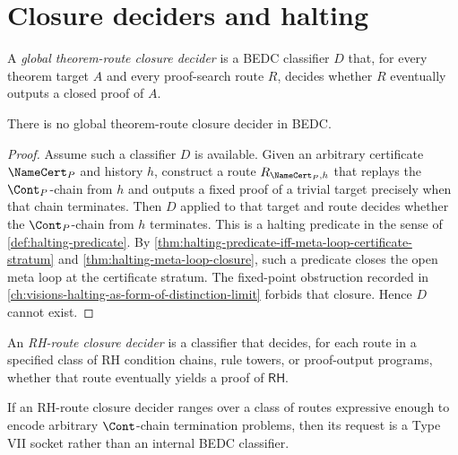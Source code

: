 \section{Closure deciders and halting}
\label{sec:rh-route-closure-deciders}

\begin{definition}
\label{def:global-theorem-route-closure-decider}
A \emph{global theorem-route closure decider} is a BEDC classifier $D$ that,
for every theorem target $A$ and every proof-search route $R$, decides
whether $R$ eventually outputs a closed proof of $A$.
\end{definition}

\begin{theorem}
\label{thm:no-global-theorem-route-closure-decider}
There is no global theorem-route closure decider in BEDC.
\end{theorem}

\begin{proof}
Assume such a classifier $D$ is available.  Given an arbitrary certificate
$\NameCert_P$ and history $h$, construct a route $R_{\NameCert_P,h}$ that
replays the $\Cont_P$-chain from $h$ and outputs a fixed proof of a trivial
target precisely when that chain terminates.  Then $D$ applied to that
target and route decides whether the $\Cont_P$-chain from $h$ terminates.
This is a halting predicate in the sense of
\autoref{def:halting-predicate}.  By
\autoref{thm:halting-predicate-iff-meta-loop-certificate-stratum} and
\autoref{thm:halting-meta-loop-closure}, such a predicate closes the open
meta loop at the certificate stratum.  The fixed-point obstruction recorded
in \autoref{ch:visions-halting-as-form-of-distinction-limit} forbids that
closure.  Hence $D$ cannot exist.
\end{proof}

\begin{definition}
\label{def:rh-route-closure-decider}
An \emph{RH-route closure decider} is a classifier that decides, for each
route in a specified class of RH condition chains, rule towers, or
proof-output programs, whether that route eventually yields a proof of
$\mathsf{RH}$.
\end{definition}

\begin{theorem}
\label{thm:rh-route-decider-type-vii-socket}
If an RH-route closure decider ranges over a class of routes expressive
enough to encode arbitrary $\Cont$-chain termination problems, then its
request is a Type VII socket rather than an internal BEDC classifier.
\end{theorem}

